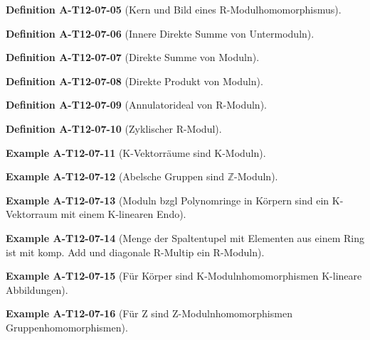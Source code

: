 \documentclass[10pt, letterpaper]{article}
\newcommand{\Z}{\mathbb{Z}}
\newcommand{\CustomHeading}[3]{%
  \par\medskip\noindent%
  \textbf{#1 #2} \textnormal{(#3)}.\enskip%
}
\newenvironment{DEF}[2]{\CustomHeading{Definition}{#1}{#2}}{}
\newenvironment{EXA}[2]{\CustomHeading{Example}{#1}{#2}}{}
\begin{document}
\begin{DEF}{A-T12-07-05}{Kern und Bild eines R-Modulhomomorphismus}
\end{DEF}

\begin{DEF}{A-T12-07-06}{Innere Direkte Summe von Untermoduln}
\end{DEF}

\begin{DEF}{A-T12-07-07}{Direkte Summe von Moduln}
\end{DEF}

\begin{DEF}{A-T12-07-08}{Direkte Produkt von Moduln}
\end{DEF}

\begin{DEF}{A-T12-07-09}{Annulatorideal von R-Moduln}
\end{DEF}

\begin{DEF}{A-T12-07-10}{Zyklischer R-Modul}
\end{DEF}

\begin{EXA}{A-T12-07-11}{K-Vektorräume sind K-Moduln}
\end{EXA}

\begin{EXA}{A-T12-07-12}{Abelsche Gruppen sind $\Z$-Moduln}
\end{EXA}

\begin{EXA}{A-T12-07-13}{Moduln bzgl Polynomringe in Körpern sind ein K-Vektorraum mit einem K-linearen Endo}
\end{EXA}

\begin{EXA}{A-T12-07-14}{Menge der Spaltentupel mit Elementen aus einem Ring ist mit komp. Add und diagonale R-Multip ein R-Moduln}
\end{EXA}

\begin{EXA}{A-T12-07-15}{Für Körper sind K-Modulnhomomorphismen K-lineare Abbildungen}
\end{EXA}

\begin{EXA}{A-T12-07-16}{Für Z sind Z-Modulnhomomorphismen Gruppenhomomorphismen}
\end{EXA}
\end{document}
